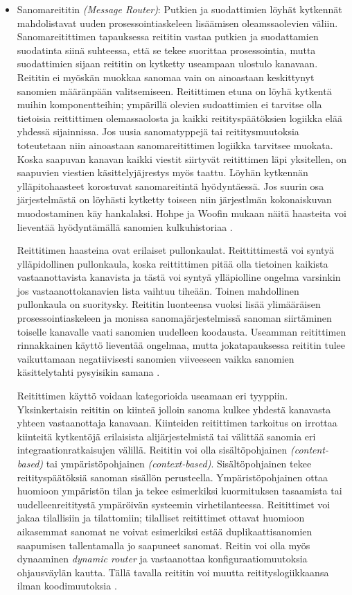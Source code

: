 \begin{itemize}
   \newpage
   \item Sanomareititin \textit{(Message Router)}:
      Putkien ja suodattimien löyhät kytkennät mahdolistavat uuden prosessointiaskeleen lisäämisen oleamssaolevien väliin. 
      Sanomareitittimen tapauksessa reititin vastaa putkien ja suodattamien suodatinta siinä suhteessa, että se tekee suorittaa prosessointia, mutta suodattimien sijaan reititin on kytketty useampaan ulostulo kanavaan. Reititin ei myöskän muokkaa sanomaa vain on ainoastaan keskittynyt sanomien määränpään valitsemiseen.
      Reitittimen etuna on löyhä kytkentä muihin komponentteihin; ympärillä olevien sudoattimien ei tarvitse olla tietoisia reittittimen olemassaolosta ja kaikki reitityspäätöksien logiikka elää yhdessä sijainnissa. Jos uusia sanomatyppejä tai reititysmuutoksia toteutetaan niin ainoastaan sanomareitittimen logiikka tarvitsee muokata. Koska saapuvan kanavan kaikki viestit siirtyvät reitittimen läpi yksitellen, on saapuvien viestien käsittelyjäjrestys myös taattu.
      Löyhän kytkennän ylläpitohaasteet korostuvat sanomareitintä hyödyntäessä. Jos suurin osa järjestelmästä on löyhästi kytketty toiseen niin järjestlmän kokonaiskuvan muodostaminen käy hankalaksi. Hohpe ja Woofin mukaan näitä haasteita voi lieventää hyödyntämällä sanomien kulkuhistoriaa \citep[sivu~93]{Hohpe2004}.


      Reittitimen haasteina ovat erilaiset pullonkaulat. Reittittimestä voi syntyä ylläpidollinen pullonkaula, koska reittittimen pitää olla tietoinen kaikista vastaanottavista kanavista ja tästä voi syntyä ylläpiolline ongelma varsinkin jos vastaanottokanavien lista vaihtuu tiheään. Toinen mahdollinen pullonkaula on suoritysky. Reititin luonteensa vuoksi lisää ylimääräisen prosessointiaskeleen ja monissa sanomajärjestelmissä sanoman siirtäminen toiselle kanavalle vaati sanomien uudelleen koodausta. Useamman reitittimen rinnakkainen käyttö lieventää ongelmaa, mutta jokatapauksessa reititin tulee vaikuttamaan negatiivisesti sanomien viiveeseen vaikka sanomien käsittelytahti pysyisikin samana \citep[sivu~93]{Hohpe2004}.


      Reitittimen käyttö voidaan kategorioida useamaan eri tyyppiin. Yksinkertaisin reititin on kiinteä jolloin sanoma kulkee yhdestä kanavasta yhteen vastaanottaja kanavaan. Kiinteiden reitittimen tarkoitus on irrottaa kiinteitä kytkentöjä erilaisista alijärjestelmistä tai välittää sanomia eri integraationratkaisujen välillä.
      Reititin voi olla sisältöpohjainen \textit{(content-based)} tai ympäristöpohjainen \textit{(context-based)}. Sisältöpohjainen tekee reitityspäätöksiä sanoman sisällön perusteella. Ympäristöpohjainen ottaa huomioon ympäristön tilan ja tekee esimerkiksi kuormituksen tasaamista tai uudelleenreititystä ympäröivän systeemin virhetilanteessa.
      Reitittimet voi jakaa tilallisiin ja tilattomiin; tilalliset reitittimet ottavat huomioon aikasemmat sanomat ne voivat esimerkiksi estää duplikaattisanomien saapumisen tallentamalla jo saapuneet sanomat.
      Reitin voi olla myös dynaaminen \textit{dynamic router} ja vastaanottaa konfiguraatiomuutoksia ohjausväylän kautta. Tällä tavalla reititin voi muutta reitityslogiikkaansa ilman koodimuutoksia \citep[sivu~94]{Hohpe2004}.



\end{itemize}
